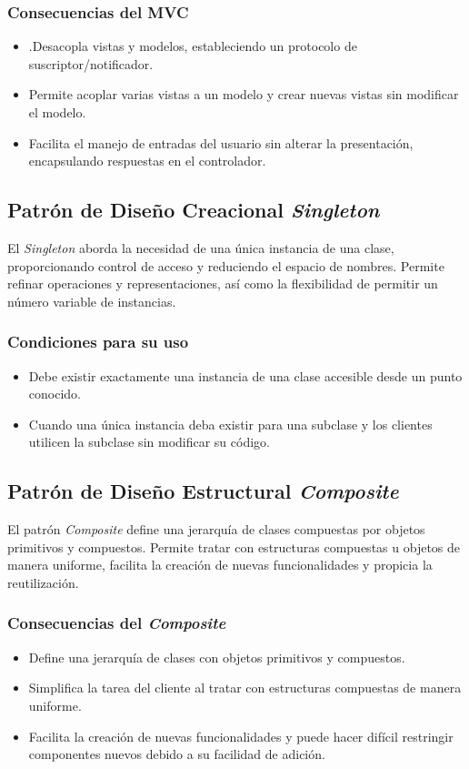 \documentclass[11pt, twocolumn]{article}
\begin{document}
  \subsubsection*{Consecuencias del MVC}
  \begin{itemize}
    \item .Desacopla vistas y modelos, estableciendo un protocolo de suscriptor/notificador.
    \item Permite acoplar varias vistas a un modelo y crear nuevas vistas sin modificar el modelo.
    \item Facilita el manejo de entradas del usuario sin alterar la presentación, encapsulando respuestas en el controlador.
  \end{itemize}

  \subsection*{Patrón de Diseño Creacional \textit{Singleton}}
  El \textit{Singleton} aborda la necesidad de una única instancia de una clase, proporcionando control de acceso y reduciendo el espacio de nombres. Permite refinar operaciones y representaciones, así como la flexibilidad de permitir un número variable de instancias.
  
  \subsubsection*{Condiciones para su uso}
  \begin{itemize}
    \item Debe existir exactamente una instancia de una clase accesible desde un punto conocido.
    \item Cuando una única instancia deba existir para una subclase y los clientes utilicen la subclase sin modificar su código.
  \end{itemize}

  \subsection*{Patrón de Diseño Estructural \textit{Composite}}
  El patrón \textit{Composite} define una jerarquía de clases compuestas por objetos primitivos y compuestos. Permite tratar con estructuras compuestas u objetos de manera uniforme, facilita la creación de nuevas funcionalidades y propicia la reutilización.

  \subsubsection*{Consecuencias del \textit{Composite}}
  \begin{itemize}
    \item Define una jerarquía de clases con objetos primitivos y compuestos.
    \item Simplifica la tarea del cliente al tratar con estructuras compuestas de manera uniforme.
    \item Facilita la creación de nuevas funcionalidades y puede hacer difícil restringir componentes nuevos debido a su facilidad de adición.
  \end{itemize}
\end{document}

